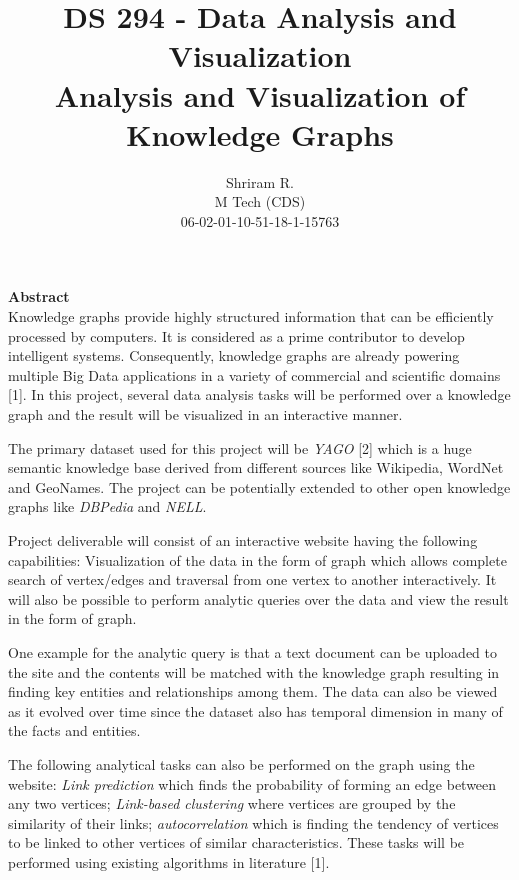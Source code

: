 \documentclass[11pt,a4paper,oneside]{article}
\begin{document}
	\title{DS 294 - Data Analysis and Visualization \\ Analysis and Visualization of Knowledge Graphs}
	\author{Shriram R. \\ M Tech (CDS) \\ 06-02-01-10-51-18-1-15763}
	\maketitle	
	
	\textbf{Abstract} \\
	
	Knowledge graphs provide highly structured information that can be efficiently processed by computers. It is considered as a prime contributor to develop intelligent systems.	Consequently, knowledge graphs are already powering multiple Big Data applications in a variety of commercial and scientific domains [1]. In this project, several data analysis tasks will be performed over a knowledge graph and the result will be visualized in an interactive manner.
	
	The primary dataset used for this project will be \emph{YAGO} [2] which is a huge semantic knowledge base derived from different sources like Wikipedia, WordNet and GeoNames. The project can be potentially extended to other open knowledge graphs like \emph{DBPedia} and \emph{NELL}.
	
	Project deliverable will consist of an interactive website having the following capabilities: Visualization of the data in the form of graph which allows complete search of vertex/edges and traversal from one vertex to another interactively. It will also be possible to perform analytic queries over the data and view the result in the form of graph.
	
	One example for the analytic query is that a text document can be uploaded to the site and the contents will be matched with the knowledge graph resulting in finding key entities and relationships among them. The data can also be viewed as it evolved over time since the dataset also has temporal dimension in many of the facts and entities.
	
	The following analytical tasks can also be performed on the graph using the website: \emph{Link prediction} which finds the probability of forming an edge between any two vertices; \emph{Link-based clustering} where vertices are grouped by the similarity of their links; \emph{autocorrelation} which is finding the tendency of vertices to be linked to other vertices of similar characteristics. These tasks will be performed using existing algorithms in literature [1]. 
	
\end{document}
